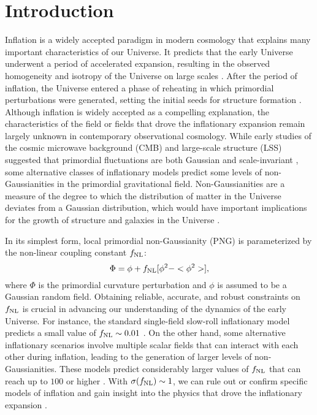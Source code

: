 \section{Introduction}
\label{sec:introduction}

Inflation is a widely accepted paradigm in modern cosmology that explains many important characteristics of our Universe. It predicts that the early Universe underwent a period of accelerated expansion, resulting in the observed homogeneity and isotropy of the Universe on large scales \citep[see, e.g.,][for a review]{weinberg2013observational}. After the period of inflation, the Universe entered a phase of reheating in which primordial perturbations were generated, setting the initial seeds for structure formation \citep{kofman1994reheating, bassett2006inflation, lyth2009primordial}. Although inflation is widely accepted as a compelling explanation, the characteristics of the field or fields that drove the inflationary expansion remain largely unknown in contemporary observational cosmology. While early studies of the cosmic microwave background (CMB) and large-scale structure (LSS) suggested that primordial fluctuations are both Gaussian and scale-invariant \citep{PhysRevD.69.103501, guth2005inflationary}, some alternative classes of inflationary models predict some levels of non-Gaussianities in the primordial gravitational field. Non-Gaussianities are a measure of the degree to which the distribution of matter in the Universe deviates from a Gaussian distribution, which would have important implications for the growth of structure and galaxies in the Universe \citep[see, e.g.,][]{2010CQGra..27l4011D, Biagetti2019Galax...7...71B}.

In its simplest form, local primordial non-Gaussianity (PNG) is parameterized by the non-linear coupling constant $f_{\rm NL}$\citep{komatsu2001acoustic}:
\begin{equation}
 \Phi = \phi + f_{\rm NL} [\phi^{2} - <\phi^{2}>],
\end{equation}
where $\Phi$ is the primordial curvature perturbation and $\phi$ is assumed to be a Gaussian random field. Obtaining reliable, accurate, and robust constraints on $f_{\rm NL}$ is crucial in advancing our understanding of the dynamics of the early Universe. For instance, the standard single-field slow-roll inflationary model predicts a small value of $f_{\rm NL} \sim 0.01$ \citep[see, e.g.,][]{2003JHEP...05..013M}. On the other hand, some alternative inflationary scenarios involve multiple scalar fields that can interact with each other during inflation, leading to the generation of larger levels of non-Gaussianities. These models predict considerably larger values of $f_{\rm NL}$ that can reach up to $100$ or higher \citep[see, e.g.,][]{Byrnes_2008, 2011PhRvD..84b3520P}. With $\sigma (f_{\rm NL})\sim 1$, we can rule out or confirm specific models of inflation and gain insight into the physics that drove the inflationary expansion \citep[see, e.g.,][]{alvarez2014arXiv1412.4671A, de2017next}.

